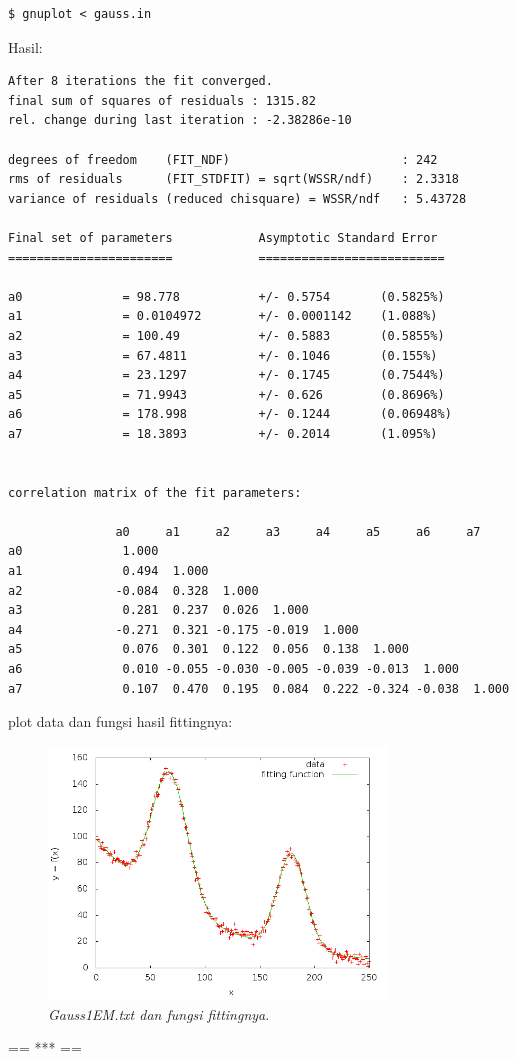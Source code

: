 \documentclass[paper=a4, fontsize=11pt]{scrartcl}
\numberwithin{equation}{section} %
\numberwithin{figure}{section} %
\numberwithin{table}{section} %
\begin{document}
\begin{enumerate}
\lstset{numbers=none}
\begin{lstlisting}
$ gnuplot < gauss.in
\end{lstlisting}

Hasil:
\begin{small}
\begin{verbatim}
After 8 iterations the fit converged.
final sum of squares of residuals : 1315.82
rel. change during last iteration : -2.38286e-10

degrees of freedom    (FIT_NDF)                        : 242
rms of residuals      (FIT_STDFIT) = sqrt(WSSR/ndf)    : 2.3318
variance of residuals (reduced chisquare) = WSSR/ndf   : 5.43728

Final set of parameters            Asymptotic Standard Error
=======================            ==========================

a0              = 98.778           +/- 0.5754       (0.5825%)
a1              = 0.0104972        +/- 0.0001142    (1.088%)
a2              = 100.49           +/- 0.5883       (0.5855%)
a3              = 67.4811          +/- 0.1046       (0.155%)
a4              = 23.1297          +/- 0.1745       (0.7544%)
a5              = 71.9943          +/- 0.626        (0.8696%)
a6              = 178.998          +/- 0.1244       (0.06948%)
a7              = 18.3893          +/- 0.2014       (1.095%)


correlation matrix of the fit parameters:

               a0     a1     a2     a3     a4     a5     a6     a7     
a0              1.000 
a1              0.494  1.000 
a2             -0.084  0.328  1.000 
a3              0.281  0.237  0.026  1.000 
a4             -0.271  0.321 -0.175 -0.019  1.000 
a5              0.076  0.301  0.122  0.056  0.138  1.000 
a6              0.010 -0.055 -0.030 -0.005 -0.039 -0.013  1.000 
a7              0.107  0.470  0.195  0.084  0.222 -0.324 -0.038  1.000 
\end{verbatim}
\end{small}

plot data dan fungsi hasil fittingnya:
\begin{figure}
	\centering
	\includegraphics[width=0.8\textwidth]
		{gauss.png}
	\caption{\textit{Gauss1EM.txt dan fungsi fittingnya}.}
\end{figure}

\vspace{8cm}
\begin{center}
== *** ==
\end{center}
\end{enumerate}
\end{document}
